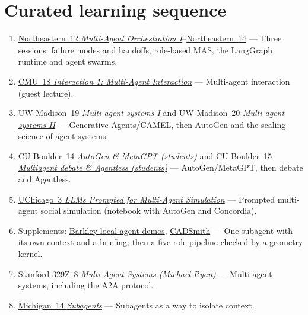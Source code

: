 \documentclass[10pt,oneside]{report}
\begin{document}
\section{Curated learning sequence}
\begin{enumerate}
\item \hyperlink{lec-NEU-12}{Northeastern~12 \emph{Multi-Agent Orchestration I}}--\hyperlink{lec-NEU-14}{Northeastern~14} --- Three sessions: failure modes and handoffs, role-based MAS, the LangGraph runtime and agent swarms.
\item \hyperlink{lec-CMU-18}{CMU~18 \emph{Interaction 1: Multi-Agent Interaction}} --- Multi-agent interaction (guest lecture).
\item \hyperlink{lec-UW-19}{UW-Madison~19 \emph{Multi-agent systems I}} and \hyperlink{lec-UW-20}{UW-Madison~20 \emph{Multi-agent systems II}} --- Generative Agents/CAMEL, then AutoGen and the scaling science of agent systems.
\item \hyperlink{lec-CU-14}{CU Boulder~14 \emph{AutoGen \& MetaGPT (students)}} and \hyperlink{lec-CU-15}{CU Boulder~15 \emph{Multiagent debate \& Agentless (students)}} --- AutoGen/MetaGPT, then debate and Agentless.
\item \hyperlink{lec-UCHI-3}{UChicago~3 \emph{LLMs Prompted for Multi-Agent Simulation}} --- Prompted multi-agent social simulation (notebook with AutoGen and Concordia).
\item Supplements: \hyperref[sup-barkley]{Barkley local agent demos}, \hyperref[sup-cadsmith]{CADSmith} --- One subagent with its own context and a briefing; then a five-role pipeline checked by a geometry kernel.
\item \hyperlink{lec-S329Z-8}{Stanford 329Z~8 \emph{Multi-Agent Systems (Michael Ryan)}} --- Multi-agent systems, including the A2A protocol.
\item \hyperlink{lec-UMICH-14}{Michigan~14 \emph{Subagents}} --- Subagents as a way to isolate context.
\end{enumerate}
\end{document}
